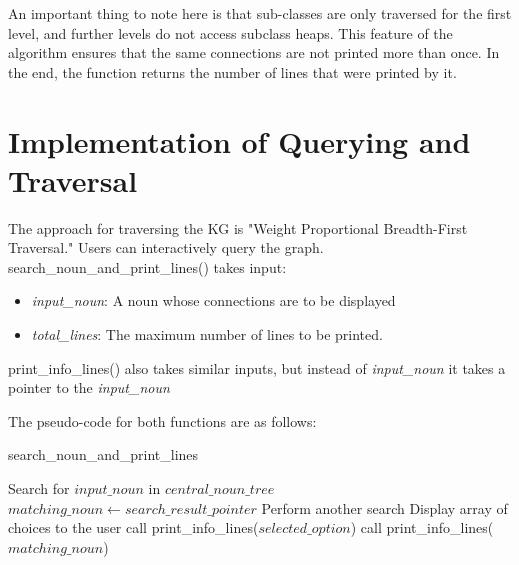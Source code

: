 \documentclass[conference]{IEEEtran}
\begin{document}
An important thing to note here is that sub-classes are only traversed for the first level, and further levels do not access subclass heaps. This feature of the algorithm ensures that the same connections are not printed more than once.
In the end, the function returns the number of lines that were printed by it.



\section{Implementation of Querying and Traversal}

The approach for traversing the KG is "Weight Proportional Breadth-First Traversal." Users can interactively query the graph.\\
search\_noun\_and\_print\_lines() takes input: 
\begin{itemize}
\item \textit{input\_noun}: A noun whose connections are to be displayed
\item \textit{total\_lines}: The maximum number of lines to be printed. 
\end{itemize}
print\_info\_lines() also takes similar inputs, but instead of \textit{input\_noun} it takes a pointer to the \textit{input\_noun}


The pseudo-code for both functions are as follows:


\begin{algorithm}
\caption{search\_noun\_and\_print\_lines}
\begin{algorithmic}[1]
    \State Search for $input\_noun$ in $central\_noun\_tree$
    \State $matching\_noun \gets search\_result\_pointer$
        \State Perform another search
        \State Display array of choices to the user
            \State call print\_info\_lines($selected\_option$)
        \EndFor
    \Else
        \State call print\_info\_lines($matching\_noun$)
    \EndIf
\EndProcedure
\end{algorithmic}
\end{algorithm}
\end{document}

